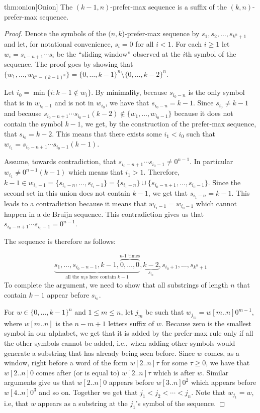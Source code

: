 \documentclass{article} %
\theoremstyle{definition} \newtheorem{definition}[theorem]{Definition}
\begin{document}
	
	\begin{repeatedtheorem}{thm:onion}[Onion] The $(k-1,n)$-prefer-max sequence is
		a suffix of the $(k,n)$-prefer-max sequence. \end{repeatedtheorem}
	\begin{proof} Denote the symbols of the $(n,k$)-prefer-max sequence by
		$s_1,s_2,\dots,s_{k^n+1}$ and let, for notational convenience, $s_i=0$ for all
		$i<1$.  For each $i\geq 1$ let $w_i=s_{i-n+1}\cdots s_i$ be the ``sliding
		window'' observed at the $i$th symbol of the sequence. The proof goes by
		showing that $\{w_1,\dots,w_{k^n-(k-1)^n}\} = \{0,\dots,k-1\}^n \setminus
		\{0,\dots,k-2\}^n$.
		
		Let ${i_0} = \min\{i\colon k-1 \notin w_i\}$. By minimality, because
		$s_{{i_0}-n}$ is the only symbol that is in $w_{i_0-1}$ and is not in
		$w_{i_0}$, we have that $s_{{i_0}-n}=k-1$. Since $s_{i_0} \neq k-1$ and
		because $s_{{i_0}-n+1}\cdots s_{{i_0}-1} (k-2) \notin \{w_1,\dots,w_{i_0-1}\}$
		because it does not contain the symbol $k-1$, we get, by the construction of
		the prefer-max sequence, that $s_{{i_0}}=k-2$. This means that there exists
		some ${i_1}<{i_0}$ such that $w_{i_1} = s_{{i_0}-n+1}\cdots s_{{i_0}-1}(k-1)$.
		
		Assume, towards contradiction, that $s_{{i_0}-n+1}\cdots s_{{i_0}-1} \neq
		0^{n-1}$. In particular $w_{i_1} \neq 0^{n-1}(k-1)$ which means that ${i_1} >
		1$. Therefore, $k-1  \in w_{i_1-1}=
		\{s_{{i_1}-n},\dots,s_{{i_1}-1}\}=\{s_{{i_1}-n}\} \cup
		\{s_{{i_0}-n+1},\dots,s_{{i_0}-1}\}$. Since the second set in this union does
		not contain $k-1$, we get that $s_{{i_1}-n}=k-1$. This leads to a
		contradiction because it means that $w_{{i_1}-1} = w_{{i_0}-1}$ which cannot
		happen in a de Bruijn sequence. This contradiction gives us that
		$s_{{i_0}-n+1}\cdots s_{{i_0}-1} = 0^{n-1}$.
		
		The sequence is therefore as follows:
		
		$$\underbrace{s_1,\dots,s_{i_0-n-1},k-1,\overbrace{0,\dots,0}^\text{$n\text{-}1$ times}}_{\text{all the $w_i$s here contain $k-1$}},\underbrace{k-2}_{s_{i_0}},s_{i_0+1},\dots,s_{k^n+1}$$ To complete the argument, we need to show that all substrings of length $n$ that contain $k-1$ appear before $s_{i_0}$.
		
		For $w \in \{0,\dots,k-1\}^n$ and $1 \leq m \leq n$, let $j_m$ be such that
		$w_{j_m} = w[m..n]0^{m-1}$, where $w[m..n]$ is the $n-m+1$ letters suffix of
		$w$. Because zero is the smallest symbol in our alphabet, we get that it is
		added by the prefer-max rule only if all the other symbols cannot be added,
		i.e., when adding other symbols would generate a substring that has already
		being seen before. Since $w$ comes, as a window, right before a word of the
		form $w[2..n]\tau$ for some $\tau \geq 0$, we have that $w[2..n]0$ comes after
		(or is equal to) $w[2..n]\tau$ which is after $w$. Similar arguments give us
		that $w[2..n]0$ appears before $w[3..n]0^2$ which appears before $w[4..n]0^3$
		and so on. Together we get that $j_1 < j_2 < \cdots < j_n$. Note that
		$w_{j_1}=w$, i.e, that $w$ appears as a substring at the $j_1$'s symbol of the
		sequence.
		

\end{proof}
\end{document}
